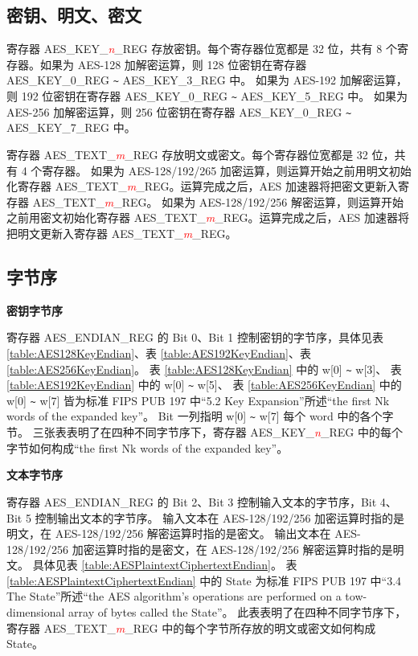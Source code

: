 \documentclass[main\_\_CN.tex]{subfiles}
\begin{document}
\subsection{密钥、明文、密文}

寄存器 AES\_KEY\_\textcolor{red}{\it{n}}\_REG 存放密钥。每个寄存器位宽都是 32 位，共有 8 个寄存器。如果为 AES-128 加解密运算，则 128 位密钥在寄存器 AES\_KEY\_0\_REG \verb+~+ AES\_KEY\_3\_REG 中。
如果为 AES-192 加解密运算，则 192 位密钥在寄存器 AES\_KEY\_0\_REG \verb+~+ AES\_KEY\_5\_REG 中。
如果为 AES-256 加解密运算，则 256 位密钥在寄存器 AES\_KEY\_0\_REG \verb+~+ AES\_KEY\_7\_REG 中。

寄存器 AES\_TEXT\_\textcolor{red}{\it{m}}\_REG 存放明文或密文。每个寄存器位宽都是 32 位，共有 4 个寄存器。
如果为 AES-128/192/265 加密运算，则运算开始之前用明文初始化寄存器 AES\_TEXT\_\textcolor{red}{\it{m}}\_REG。运算完成之后，AES 加速器将把密文更新入寄存器 AES\_TEXT\_\textcolor{red}{\it{m}}\_REG。
如果为 AES-128/192/256 解密运算，则运算开始之前用密文初始化寄存器 AES\_TEXT\_\textcolor{red}{\it{m}}\_REG。运算完成之后，AES 加速器将把明文更新入寄存器 AES\_TEXT\_\textcolor{red}{\it{m}}\_REG。


\subsection{字节序}

\textbf{密钥字节序}

寄存器 AES\_ENDIAN\_REG 的 Bit 0、Bit 1 控制密钥的字节序，具体见表 \ref{table:AES128KeyEndian}、表 \ref{table:AES192KeyEndian}、表 \ref{table:AES256KeyEndian}。
表 \ref{table:AES128KeyEndian} 中的 w[0] \verb+~+ w[3]、
表 \ref{table:AES192KeyEndian} 中的 w[0] \verb+~+ w[5]、
表 \ref{table:AES256KeyEndian} 中的 w[0] \verb+~+ w[7] 皆为标准 FIPS PUB 197 中“5.2 Key Expansion”所述“the first Nk words of the expanded key”。
Bit 一列指明 w[0] \verb+~+ w[7] 每个 word 中的各个字节。
三张表表明了在四种不同字节序下，寄存器 AES\_KEY\_\textcolor{red}{\it{n}}\_REG 中的每个字节如何构成“the first Nk words of the expanded key”。

\textbf{文本字节序}

寄存器 AES\_ENDIAN\_REG 的 Bit 2、Bit 3 控制输入文本的字节序，Bit 4、Bit 5 控制输出文本的字节序。
输入文本在 AES-128/192/256 加密运算时指的是明文，在 AES-128/192/256 解密运算时指的是密文。
输出文本在 AES-128/192/256 加密运算时指的是密文，在 AES-128/192/256 解密运算时指的是明文。
具体见表 \ref{table:AESPlaintextCiphertextEndian}。
表 \ref{table:AESPlaintextCiphertextEndian} 中的 State 为标准 FIPS PUB 197 中“3.4 The State”所述“the AES algorithm's operations are performed on a tow-dimensional array of bytes called the State”。
此表表明了在四种不同字节序下，寄存器 AES\_TEXT\_\textcolor{red}{\it{m}}\_REG 中的每个字节所存放的明文或密文如何构成 State。
\end{document}
